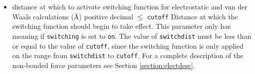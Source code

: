 \begin{itemize}


\item
{}
{distance at which to activate switching function 
for electrostatic and van der Waals calculations (\AA)}
{positive decimal $\leq$ \verb!cutoff!}
{Distance at which the switching function
should begin to take effect.  
This parameter only has meaning if \verb!switching! is 
set to \verb!on!.  
The value of \verb!switchdist! must be less than
or equal to the value of \verb!cutoff!, since the switching function
is only applied on the range from \verb!switchdist! to \verb!cutoff!.  
For a complete description of the non-bonded force parameters see
Section \ref{section:electdesc}.}


\end{itemize}
